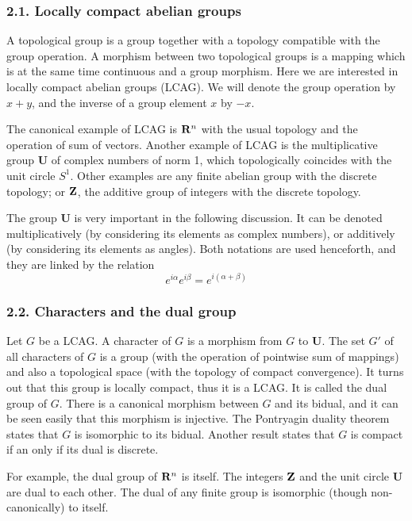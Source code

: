 \subsubsection{2.1. Locally compact abelian groups}

A topological group is a group together with a topology compatible with the
group operation.  A morphism between two topological groups is a mapping
which is at the same time continuous and a group morphism.
Here we are interested in locally compact abelian groups (LCAG).  We
will denote the group operation by $x+y$, and the inverse of a group element
$x$ by $-x$.

The canonical example of LCAG is $\mathbf{R}^n$ with the usual topology and
the operation of sum of vectors.  Another example of LCAG is the
multiplicative group $\mathbf{U}$ of complex numbers of norm 1, which
topologically coincides with the unit circle $S^1$.  Other examples are any
finite abelian group with the discrete topology; or $\mathbf{Z}$, the
additive group of integers with the discrete topology.

The group $\mathbf{U}$ is very important in the following discussion.  It can
be denoted multiplicatively (by considering its elements as complex numbers),
or additively (by considering its elements as angles).  Both notations are
used henceforth, and they are linked by the relation
\[
e^{i\alpha}e^{i\beta}
=
e^{i(\alpha+\beta)}
\]


\subsubsection{2.2. Characters and the dual group}

Let $G$ be a LCAG.  A character of $G$ is a morphism from $G$ to
$\mathbf{U}$.  The set $G'$ of all characters of $G$ is a group (with the
operation of pointwise sum of mappings) and also a topological space (with the topology
of compact convergence).  It turns out that this group is locally compact,
thus it is a LCAG.  It is called the dual group of $G$.  There is a canonical
morphism between $G$ and its bidual, and it can be seen easily that this
morphism is injective.  The Pontryagin duality theorem states that $G$ is
isomorphic to its bidual.  Another result states that $G$ is compact if an
only if its dual is discrete.

For example, the dual group of $\mathbf{R}^n$ is itself.  The integers
$\mathbf{Z}$ and the unit circle $\mathbf{U}$ are dual to each other.
The dual of any finite group is isomorphic (though non-canonically) to
itself.

